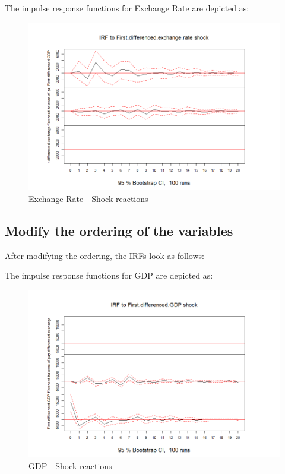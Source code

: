 \documentclass[
]{article}
\begin{document}
The impulse response functions for Exchange Rate are depicted as:

\begin{figure}

{\centering \includegraphics[width=0.8\linewidth]{../results/IRF_plots/IRF_to_First.differenced.exchange.rate} 

}

\caption{Exchange Rate - Shock reactions}\label{fig:unnamed-chunk-26}
\end{figure}

\subsection{Modify the ordering of the variables}

After modifying the ordering, the IRFs look as follows:

The impulse response functions for GDP are depicted as:

\begin{figure}

{\centering \includegraphics[width=0.8\linewidth]{../results/IRF_plots2/IRF_to_First.differenced.GDP} 

}

\caption{GDP - Shock reactions}\label{fig:unnamed-chunk-27}
\end{figure}
\end{document}
